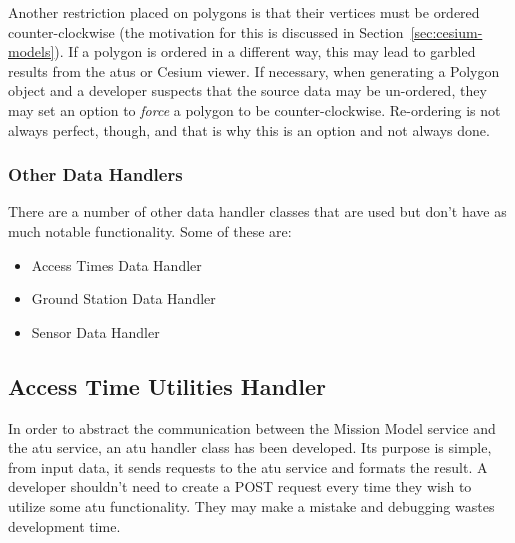 
Another restriction placed on polygons is that their vertices must be ordered
counter-clockwise (the motivation for this is discussed in
Section~\ref{sec:cesium-models}). If a polygon is ordered in a different way,
this may lead to garbled results from the \glspl{atu} or Cesium viewer. If
necessary, when generating a Polygon object and a developer suspects that the
source data may be un-ordered, they may set an option to \textit{force} a
polygon to be counter-clockwise. Re-ordering is not always perfect, though, and
that is why this is an option and not always done. 



\subsubsection{Other Data Handlers}

There are a number of other data handler classes that are used but don't have
as much notable functionality. Some of these are:

\begin{itemize} 
    
    \item Access Times Data Handler
    \item Ground Station Data Handler
    \item Sensor Data Handler

\end{itemize}



\subsection{Access Time Utilities Handler}

In order to abstract the communication between the Mission Model service and
the \gls{atu} service, an \gls{atu} handler class has been developed. Its
purpose is simple, from input data, it sends requests to the \gls{atu}
service and formats the result. A developer shouldn't need to create a POST
request every time they wish to utilize some \gls{atu} functionality. They
may make a mistake and debugging wastes development time. 


